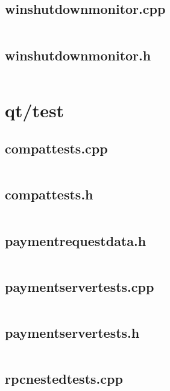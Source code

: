 \documentclass{article}
\begin{document}
\subsection{winshutdownmonitor.cpp}
\inputminted{cpp}{/home/dufferzafar/dev/@clones/bitcoin/src/qt/winshutdownmonitor.cpp}
\newpage

\subsection{winshutdownmonitor.h}
\inputminted{cpp}{/home/dufferzafar/dev/@clones/bitcoin/src/qt/winshutdownmonitor.h}
\newpage

\section{qt/test}

\subsection{compattests.cpp}
\inputminted{cpp}{/home/dufferzafar/dev/@clones/bitcoin/src/qt/test/compattests.cpp}
\newpage

\subsection{compattests.h}
\inputminted{cpp}{/home/dufferzafar/dev/@clones/bitcoin/src/qt/test/compattests.h}
\newpage

\subsection{paymentrequestdata.h}
\inputminted{cpp}{/home/dufferzafar/dev/@clones/bitcoin/src/qt/test/paymentrequestdata.h}
\newpage

\subsection{paymentservertests.cpp}
\inputminted{cpp}{/home/dufferzafar/dev/@clones/bitcoin/src/qt/test/paymentservertests.cpp}
\newpage

\subsection{paymentservertests.h}
\inputminted{cpp}{/home/dufferzafar/dev/@clones/bitcoin/src/qt/test/paymentservertests.h}
\newpage

\subsection{rpcnestedtests.cpp}
\inputminted{cpp}{/home/dufferzafar/dev/@clones/bitcoin/src/qt/test/rpcnestedtests.cpp}
\newpage
\end{document}
